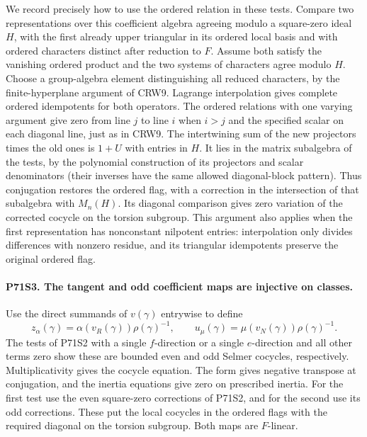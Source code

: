 We record precisely how to use the ordered relation in these
tests. Compare two representations over this coefficient algebra
agreeing modulo a square-zero ideal $H$, with the first already
upper triangular in its ordered local basis and with ordered
characters distinct after reduction to $F$. Assume both satisfy
the vanishing ordered product and the two systems of characters
agree modulo $H$. Choose a group-algebra element distinguishing
all reduced characters, by the finite-hyperplane argument of CRW9.
Lagrange interpolation gives complete ordered idempotents for both
operators. The ordered relations with one varying argument give
zero from line $j$ to line $i$ when $i>j$ and the specified scalar
on each diagonal line, just as in CRW9. The intertwining sum of
the new projectors times the old ones is $1+U$ with entries in
$H$. It lies in the matrix subalgebra of the tests, by the polynomial
construction of its projectors and scalar denominators (their
inverses have the same allowed diagonal-block pattern).
Thus conjugation restores the ordered flag, with a correction in
the intersection of that subalgebra with $M_n(H)$. Its diagonal
comparison gives zero variation of the corrected cocycle on the
torsion subgroup. This argument also applies when the first
representation has nonconstant nilpotent entries: interpolation
only divides differences with nonzero residue, and its triangular
idempotents preserve the original ordered flag.

\paragraph{P71S3. The tangent and odd coefficient maps are injective on classes.}
Use the direct summands of $v(\gamma)$ entrywise to define
\[
 z_\alpha(\gamma)=\alpha(v_R(\gamma))\rho(\gamma)^{-1},
 \qquad u_\mu(\gamma)=\mu(v_N(\gamma))\rho(\gamma)^{-1}.
\]
The tests of P71S2 with a single $f$-direction or a single
$e$-direction and all other terms zero show these are bounded
even and odd Selmer cocycles, respectively. Multiplicativity
gives the cocycle equation. The form gives negative transpose
at conjugation, and the inertia equations give zero on prescribed
inertia. For the first test use the even square-zero corrections
of P71S2, and for the second use its odd corrections. These put
the local cocycles in the ordered flags with the required diagonal
on the torsion subgroup. Both maps are $F$-linear.

